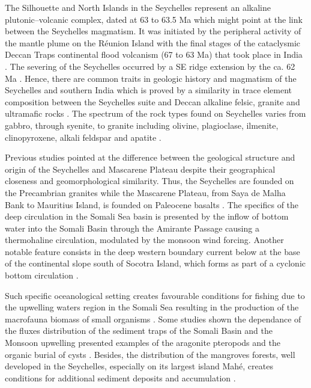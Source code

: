\documentclass[]{interact}
\begin{document}
The Silhouette and North Islands in the Seychelles represent an alkaline plutonic–volcanic complex, dated at 63 to 63.5 Ma which might point at the link between the Seychelles magmatism. It was initiated by the peripheral activity of the mantle plume on the Réunion Island with the final stages of the cataclysmic Deccan Traps continental flood volcanism (67 to 63 Ma) that took place in India \cite{Torsviketal2001}. The severing of the Seychelles occurred by a SE ridge extension by the ca. 62 Ma \cite{Collieretal2008}. Hence, there are common traits in geologic history and magmatism of the Seychelles and southern India which is proved by a similarity in trace element composition between the Seychelles suite and Deccan alkaline felsic, granite and ultramafic rocks \cite{EngelFisher}. The spectrum of the rock types found on Seychelles varies from gabbro, through syenite, to granite including olivine, plagioclase, ilmenite, clinopyroxene, alkali feldspar and apatite \cite{OwenSmithetal2013}. 

Previous studies \cite{Mart1988} pointed at the difference between the geological structure and origin of the Seychelles and Mascarene Plateau despite their geographical closeness and geomorphological similarity. Thus, the Seychelles are founded on the Precambrian granites while the Mascarene Plateau, from Saya de Malha Bank to Mauritius Island, is founded on Paleocene basalts \cite{Roonwal}.
The specifics of the deep circulation in the Somali Sea basin is presented by the inflow of bottom water into the Somali Basin through the Amirante Passage causing a thermohaline circulation, modulated by the monsoon wind forcing. Another notable feature consists in the deep western boundary current below at the base of the continental slope south of Socotra Island, which forms as part of a cyclonic bottom circulation \cite{Dengleretal2002}. 

Such specific oceanological setting creates favourable conditions for fishing due to the upwelling waters region in the Somali Sea resulting in the production of the macrofauna biomass of small organisms \cite{FieuxSwallow,Duineveldetal1997,Johnsonetal1991}. Some studies shown the dependance of the fluxes distribution of the sediment traps of the Somali Basin and the Monsoon upwelling presented examples of the aragonite pteropods \cite{SinghConan,Kloeckeretal2006} and the organic burial of cysts \cite{ZonneveldBrummer}. Besides, the distribution of the mangroves forests, well developed in the Seychelles, especially on its largest island Mahé, creates conditions for additional sediment deposits and accumulation \cite{Woodroffeetal2015}. 
\end{document}
